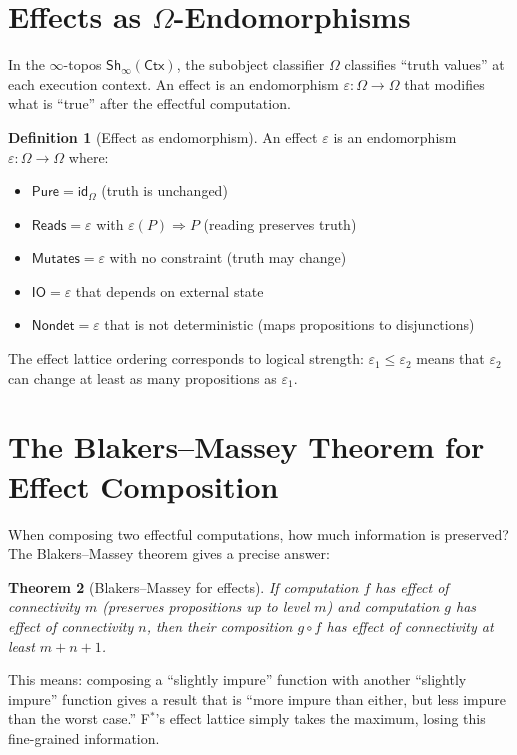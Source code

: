 \documentclass[11pt,a4paper]{report}
\theoremstyle{definition}
\newtheorem{definition}{Definition}[chapter]
\theoremstyle{plain}
\newtheorem{theorem}[definition]{Theorem}
\newcommand{\Ctx}{\mathsf{Ctx}}
\newcommand{\Pure}{\mathsf{Pure}}
\newcommand{\Reads}{\mathsf{Reads}}
\newcommand{\Mutates}{\mathsf{Mutates}}
\newcommand{\IO}{\mathsf{IO}}
\newcommand{\Nondet}{\mathsf{Nondet}}
\newcommand{\fstar}{F$^{*}$}
\newcommand{\Sh}{\mathsf{Sh}}
\begin{document}
\section{Effects as $\Omega$-Endomorphisms}

In the $\infty$-topos $\Sh_\infty(\Ctx)$, the subobject classifier $\Omega$
classifies ``truth values'' at each execution context. An effect is an endomorphism
$\varepsilon : \Omega \to \Omega$ that modifies what is ``true'' after the
effectful computation.

\begin{definition}[Effect as endomorphism]
An effect $\varepsilon$ is an endomorphism $\varepsilon : \Omega \to \Omega$ where:
\begin{itemize}
  \item $\Pure = \mathsf{id}_\Omega$ (truth is unchanged)
  \item $\Reads = \varepsilon$ with $\varepsilon(P) \Rightarrow P$ (reading preserves truth)
  \item $\Mutates = \varepsilon$ with no constraint (truth may change)
  \item $\IO = \varepsilon$ that depends on external state
  \item $\Nondet = \varepsilon$ that is not deterministic (maps propositions to disjunctions)
\end{itemize}
\end{definition}

The effect lattice ordering corresponds to logical strength: $\varepsilon_1 \leq \varepsilon_2$
means that $\varepsilon_2$ can change at least as many propositions as $\varepsilon_1$.

\section{The Blakers--Massey Theorem for Effect Composition}

When composing two effectful computations, how much information is preserved?
The Blakers--Massey theorem gives a precise answer:

\begin{theorem}[Blakers--Massey for effects]
\label{thm:blakers-massey}
If computation $f$ has effect of connectivity $m$ (preserves propositions up to
level $m$) and computation $g$ has effect of connectivity $n$, then their
composition $g \circ f$ has effect of connectivity at least $m + n + 1$.
\end{theorem}

This means: composing a ``slightly impure'' function with another ``slightly impure''
function gives a result that is ``more impure than either, but less impure than
the worst case.'' \fstar{}'s effect lattice simply takes the maximum, losing this
fine-grained information.
\end{document}
